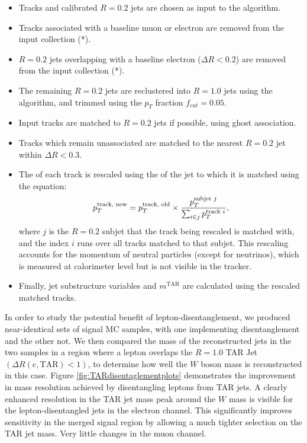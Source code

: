 \begin{itemize}
  \item Tracks and calibrated \akt $R=0.2$ jets are chosen as input to the algorithm.
  \item Tracks associated with a baseline muon or electron are removed from the input collection (*).
  \item \akt $R=0.2$ jets overlapping with a baseline electron ($\Delta R<0.2$) are removed from the input collection (*).
  \item The remaining \akt $R=0.2$ jets are reclustered into $R=1.0$ jets using the \akt algorithm, and trimmed using the $p_T$ fraction \(f_{cut}=0.05\).
  \item Input tracks are matched to $R=0.2$ jets if possible, using ghost association.
  \item Tracks which remain unassociated are matched to the nearest \akt $R=0.2$ jet within $\Delta R<0.3$.
  \item The \pT of each track is rescaled using the \pT of the jet to which it is matched using the equation:
  \begin{equation}
  p_T^{\text{track, new}} = p_T^{\text{track, old}}\times \frac{p_T^{\text{subjet $j$}}}{\sum_{i \in j} p_T^{\text{track $i$}}} ,
  \label{eq:TAR_rescale}
  \end{equation}  where $j$ is the $R=0.2$ subjet that the track being rescaled is matched with, and the index $i$ runs over all tracks matched to that subjet. This rescaling accounts for the momentum of neutral particles (except for neutrinos), which is measured at calorimeter level but is not visible in the tracker.
  \item Finally, jet substructure variables and  $m^\text{TAR}$ are calculated using the rescaled matched tracks.
\end{itemize}

In order to study the potential benefit of lepton-disentanglement, we produced near-identical sets of signal MC samples, with one implementing disentanglement and the other not.
We then compared the mass of the reconstructed jets in the two samples in a region where a lepton overlaps the $R=1.0$ TAR Jet $(\Delta R(e, \text{TAR}) < 1)$, to determine how well the $W$ boson mass is reconstructed in this case.
Figure \ref{fig:TARdisentaglementplots} demonstrates the improvement in mass resolution achieved by disentangling leptons from TAR jets. A clearly enhanced resolution in the TAR jet mass peak around the $W$ mass is visible for the lepton-disentangled jets in the electron channel. This significantly improves sensitivity in the merged signal region by allowing a much tighter selection on the TAR jet mass. Very little changes in the muon channel.

